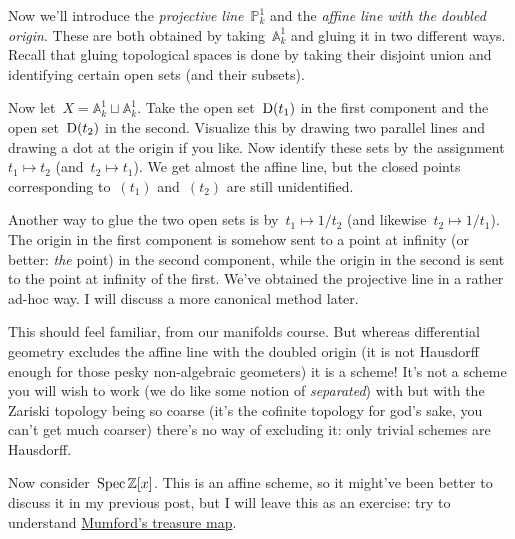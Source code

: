 \begin{example}
  Now we'll introduce the \emph{projective line}~$\mathbb{P}^1_k$ and the \emph{affine line with the doubled origin}. These are both obtained by taking~$\mathbb{A}^1_k$ and gluing it in two different ways. Recall that gluing topological spaces is done by taking their disjoint union and identifying certain open sets (and their subsets).

  Now let~$X=\mathbb{A}^1_k\sqcup\mathbb{A}^1_k$. Take the open set~$\operatorname{D}(t_1)$ in the first component and the open set~$\operatorname{D}(t_2)$ in the second. Visualize this by drawing two parallel lines and drawing a dot at the origin if you like. Now identify these sets by the assignment~$t_1\mapsto t_2$ (and~$t_2\mapsto t_1$). We get almost the affine line, but the closed points corresponding to~$(t_1)$ and~$(t_2)$ are still unidentified.

  Another way to glue the two open sets is by~$t_1\mapsto 1/t_2$ (and likewise~$t_2\mapsto 1/t_1$). The origin in the first component is somehow sent to a point at infinity (or better: \emph{the} point) in the second component, while the origin in the second is sent to the point at infinity of the first. We've obtained the projective line in a rather ad-hoc way. I will discuss a more canonical method later.

  This should feel familiar, from our manifolds course. But whereas differential geometry excludes the affine line with the doubled origin (it is not Hausdorff enough for those pesky non-algebraic geometers) it is a scheme! It's not a scheme you will wish to work (we do like some notion of \emph{separated}) with but with the Zariski topology being so coarse (it's the cofinite topology for god's sake, you can't get much coarser) there's no way of excluding it: only trivial schemes are Hausdorff.
\end{example}

\begin{example}
  Now consider~$\operatorname{Spec}\mathbb{Z}[x]$. This is an affine scheme, so it might've been better to discuss it in my previous post, but I will leave this as an exercise: try to understand \href{http://www.neverendingbooks.org/index.php/mumfords-treasure-map.html}{Mumford's treasure map}.
\end{example}
